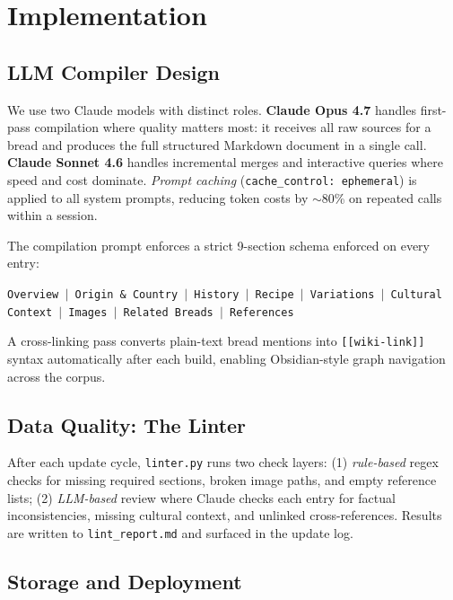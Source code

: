 \documentclass[10.5pt,a4paper]{article}
\begin{document}
\section{Implementation}

\subsection{LLM Compiler Design}

We use two Claude models with distinct roles. \textbf{Claude Opus 4.7} handles first-pass compilation where quality matters most: it receives all raw sources for a bread and produces the full structured Markdown document in a single call. \textbf{Claude Sonnet 4.6} handles incremental merges and interactive queries where speed and cost dominate. \textit{Prompt caching} (\texttt{cache\_control: ephemeral}) is applied to all system prompts, reducing token costs by $\sim$80\% on repeated calls within a session.

The compilation prompt enforces a strict 9-section schema enforced on every entry:

\vspace{2pt}
\begin{center}
\small\texttt{Overview $|$ Origin \& Country $|$ History $|$ Recipe $|$ Variations $|$ Cultural Context $|$ Images $|$ Related Breads $|$ References}
\end{center}
\vspace{2pt}

A cross-linking pass converts plain-text bread mentions into \texttt{[[wiki-link]]} syntax automatically after each build, enabling Obsidian-style graph navigation across the corpus.

\subsection{Data Quality: The Linter}

After each update cycle, \texttt{linter.py} runs two check layers: (1) \textit{rule-based} regex checks for missing required sections, broken image paths, and empty reference lists; (2) \textit{LLM-based} review where Claude checks each entry for factual inconsistencies, missing cultural context, and unlinked cross-references. Results are written to \texttt{lint\_report.md} and surfaced in the update log.

\subsection{Storage and Deployment}
\end{document}
